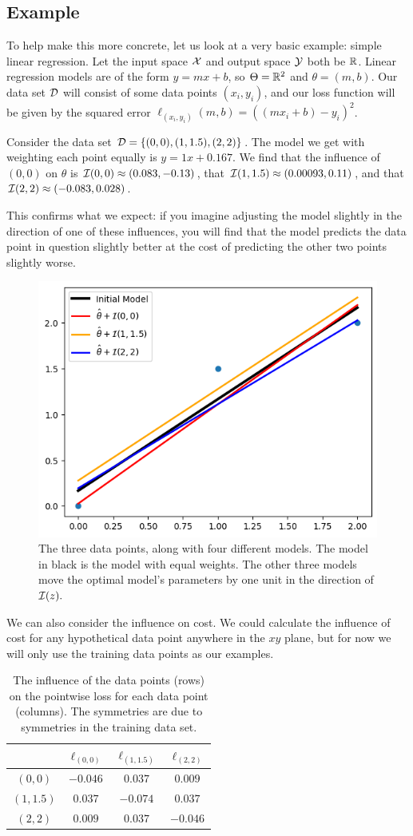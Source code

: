 \documentclass[12pt,twoside]{reedthesis}
\begin{document}
\subsection{Example}
To help make this more concrete, let us look at a very basic example: simple linear regression. Let the input space $\mathcal{X}$ and output space $\mathcal{Y}$ both be $\R$. Linear regression models are of the form $y = m x + b$, so $\Theta = \R^2$ and $\theta = (m, b)$. Our data set $\mathcal{D}$ will consist of some data points $(x_i, y_i)$, and our loss function will be given by the squared error $\ell_{(x_i, y_i)}(m, b) = ((mx_i + b) - y_i)^2$.

Consider the data set $\mathcal{D} = \left\{ (0,0), (1, 1.5), (2, 2) \right\}$. The model we get with weighting each point equally is $y = 1x + 0.167$. We find that the influence of $(0,0)$ on $\theta$ is $\mathcal{I}(0,0) \approx (0.083, -0.13)$, that $\mathcal{I} (1,1.5) \approx (0.00093, 0.11)$, and that $\mathcal{I}(2, 2) \approx (-0.083, 0.028)$. 

This confirms what we expect: if you imagine adjusting the model slightly in the direction of one of these influences, you will find that the model predicts the data point in question slightly better at the cost of predicting the other two points slightly worse.

\begin{figure}[H]
    \centering
    \includegraphics[width=0.5\linewidth]{example1.png}
    \caption{The three data points, along with four different models. The model in black is the model with equal weights. The other three models move the optimal model's parameters by one unit in the direction of $\mathcal{I}(z).$}
\end{figure}

We can also consider the influence on cost. We could calculate the influence of cost for any hypothetical data point anywhere in the $xy$ plane, but for now we will only use the training data points as our examples.

\begin{table}[H]
    \centering
    \begin{tabular}{c|c|c|c}
    & $\ell_{(0, 0)}$ & $\ell_{(1, 1.5)}$ & $\ell_{(2, 2)}$\\
    \hline
    $(0, 0)$ & $-0.046$ & $0.037$ & $0.009$\\
    \hline
    $(1, 1.5)$ & $0.037$ & $-0.074$ & $0.037$\\
    \hline
    $(2,2)$ & $0.009$ & $0.037$ & $-0.046$
    \end{tabular}
    \caption{The influence of the data points (rows) on the pointwise loss for each data point (columns). The symmetries are due to symmetries in the training data set.}
    \label{tab:my_label}
\end{table}
\end{document}
